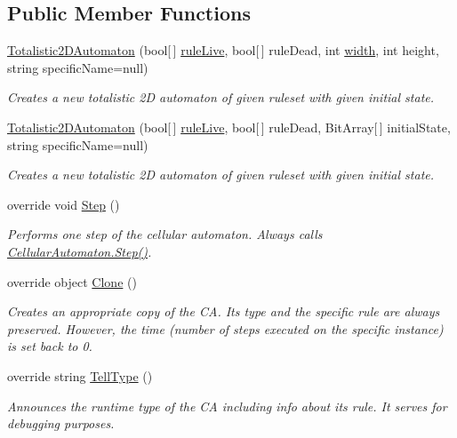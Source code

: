 \subsection*{Public Member Functions}
\begin{DoxyCompactItemize}
\item 
\hyperlink{class_cellular_1_1_totalistic2_d_automaton_a4c7a751baa03c7caf2040d07bb772e91}{Totalistic2\+D\+Automaton} (bool\mbox{[}$\,$\mbox{]} \hyperlink{class_cellular_1_1_totalistic2_d_automaton_a4752e3402c58243f7f342e21ddad3b05}{rule\+Live}, bool\mbox{[}$\,$\mbox{]} rule\+Dead, int \hyperlink{class_cellular_1_1_automaton2_d_a1e9e5ec637c747a859c346839c90d174}{width}, int height, string specific\+Name=null)
\begin{DoxyCompactList}\small\item\em Creates a new totalistic 2\+D automaton of given ruleset with given initial state. \end{DoxyCompactList}\item 
\hyperlink{class_cellular_1_1_totalistic2_d_automaton_a706f4c765a54fef6003e6e208a073a1c}{Totalistic2\+D\+Automaton} (bool\mbox{[}$\,$\mbox{]} \hyperlink{class_cellular_1_1_totalistic2_d_automaton_a4752e3402c58243f7f342e21ddad3b05}{rule\+Live}, bool\mbox{[}$\,$\mbox{]} rule\+Dead, Bit\+Array\mbox{[}$\,$\mbox{]} initial\+State, string specific\+Name=null)
\begin{DoxyCompactList}\small\item\em Creates a new totalistic 2\+D automaton of given ruleset with given initial state. \end{DoxyCompactList}\item 
override void \hyperlink{class_cellular_1_1_totalistic2_d_automaton_a7f85cac5420f67a936cbd4cef33c4abc}{Step} ()
\begin{DoxyCompactList}\small\item\em Performs one step of the cellular automaton. Always calls {\ttfamily \hyperlink{class_cellular_1_1_cellular_automaton_aa70848d58015575974bc875ac5a89ae7}{Cellular\+Automaton.\+Step()}}. \end{DoxyCompactList}\item 
override object \hyperlink{class_cellular_1_1_totalistic2_d_automaton_ae78cf4c3f8245adf64ec9a173330804f}{Clone} ()
\begin{DoxyCompactList}\small\item\em Creates an appropriate copy of the C\+A. Its type and the specific rule are always preserved. However, the time (number of steps executed on the specific instance) is set back to 0. \end{DoxyCompactList}\item 
override string \hyperlink{class_cellular_1_1_totalistic2_d_automaton_aa009c674cd109fa70173e9893f6d3b09}{Tell\+Type} ()
\begin{DoxyCompactList}\small\item\em Announces the runtime type of the C\+A including info about its rule. It serves for debugging purposes. \end{DoxyCompactList}\end{DoxyCompactItemize}
